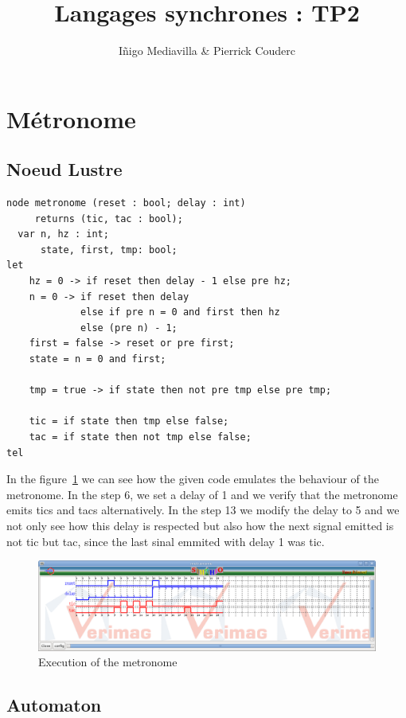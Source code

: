 \documentclass{article}
\title{Langages synchrones : TP2}
\author{I\~{n}igo Mediavilla \& Pierrick Couderc}
\begin{document}
\maketitle

\section{Métronome}


\subsection{Noeud Lustre}

\begin{verbatim}
node metronome (reset : bool; delay : int) 
     returns (tic, tac : bool);
  var n, hz : int;
      state, first, tmp: bool;
let
    hz = 0 -> if reset then delay - 1 else pre hz;
    n = 0 -> if reset then delay
             else if pre n = 0 and first then hz
             else (pre n) - 1;
    first = false -> reset or pre first;
    state = n = 0 and first;

    tmp = true -> if state then not pre tmp else pre tmp;
    
    tic = if state then tmp else false;
    tac = if state then not tmp else false;
tel
\end{verbatim}


In the figure~\ref{trace-metronome-1} we can see how the given code
emulates the behaviour of the metronome. In the step 6, we set a
delay of 1 and we verify that the metronome emits tics and tacs
alternatively. In the step 13 we modify the delay to 5 and we not
only see how this delay is respected but also how the next signal
emitted is not tic but tac, since the last sinal emmited with delay
1 was tic.

\begin{figure}[ht]
\label{trace-metronome-1}
\caption{Execution of the metronome}
\includegraphics [width=1\textwidth, natwidth=750,natheight=400]{metronome_1.png}
\end{figure}

\subsection{Automaton}
\end{document}
